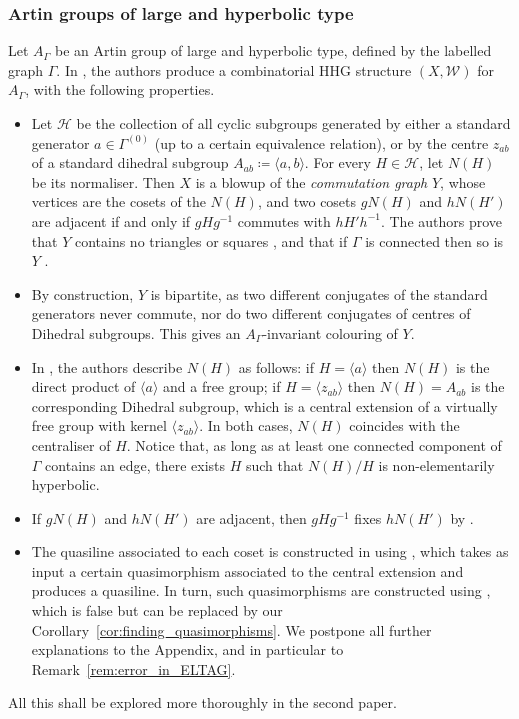 \documentclass[svgnames]{amsart}
\theoremstyle{plain}
\theoremstyle{definition}
\newcommand{\W}{\mathcal{W}}
\begin{document}
\subsubsection{Artin groups of large and hyperbolic type}\label{subsec:example_artin}
Let $A_\Gamma$ be an Artin group of large and hyperbolic type, defined by the labelled graph $\Gamma$. In \cite{ELTAG_HHS}, the authors produce a combinatorial HHG structure $(X,\W)$ for $A_\Gamma$, with the following properties.
\begin{itemize}
    \item Let $\mathcal H$ be the collection of all cyclic subgroups generated by either a standard generator $a\in \Gamma^{(0)}$ (up to a certain equivalence relation), or by the centre $z_{ab}$ of a standard dihedral subgroup $A_{ab}\coloneq\langle a, b\rangle$. For every $H\in \mathcal H$, let $N(H)$ be its normaliser. Then $X$ is a blowup of the \emph{commutation graph} $Y$, whose vertices are the cosets of the $N(H)$, and two cosets $gN(H)$ and $hN(H')$ are adjacent if and only if $gHg^{-1}$ commutes with $hH'h^{-1}$. The authors prove that $Y$ contains no triangles or squares \cite[Lemma 3.9]{ELTAG_HHS}, and that if $\Gamma$ is connected then so is $Y$ \cite[Lemma 3.10]{ELTAG_HHS}. 
    \item By construction, $Y$ is bipartite, as two different conjugates of the standard generators never commute, nor do two different conjugates of centres of Dihedral subgroups. This gives an $A_\Gamma$-invariant colouring of $Y$.
    \item In \cite[Lemmas 2.27 and 2.28]{ELTAG_HHS}, the authors describe $N(H)$ as follows: if $H=\langle a\rangle$ then $N(H)$ is the direct product of $\langle a\rangle$ and a free group; if $H=\langle z_{ab}\rangle$ then $N(H)=A_{ab}$ is the corresponding Dihedral subgroup, which is a central extension of a virtually free group with kernel $\langle z_{ab}\rangle$. In both cases, $N(H)$ coincides with the centraliser of $H$. Notice that, as long as at least one connected component of $\Gamma$ contains an edge, there exists $H$ such that $N(H)/H$ is non-elementarily hyperbolic.
    \item If $gN(H)$ and $h N(H')$ are adjacent, then $gHg^{-1}$ fixes $h N(H')$ by \cite[Lemma 3.21]{ELTAG_HHS}.
    \item The quasiline associated to each coset is constructed in \cite[Section 4.1]{ELTAG_HHS} using \cite[Lemma 4.15]{ABO}, which takes as input a certain quasimorphism associated to the central extension and produces a quasiline. In turn, such quasimorphisms are constructed using \cite[Lemma 4.4]{ELTAG_HHS}, which is false but can be replaced by our Corollary~\ref{cor:finding_quasimorphisms}. We postpone all further explanations to the Appendix, and in particular to Remark~\ref{rem:error_in_ELTAG}.
\end{itemize}
All this shall be explored more thoroughly in the second paper.
\end{document}
